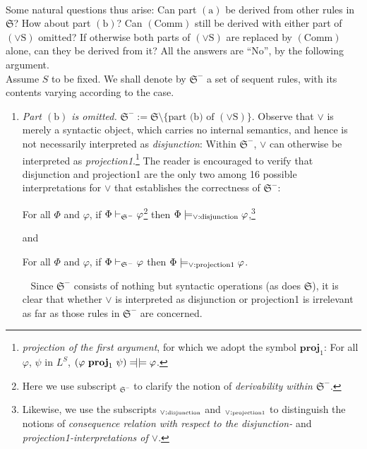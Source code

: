 \begin{enumerate}[1.]
\\
Some natural questions thus arise: Can part $(\mathrm{a})$ be derived from other rules in $\mathfrak{S}$? How about part $(\mathrm{b})$? Can $(\mathrm{Comm})$ still be derived with either part of $(\lor\mathrm{S})$ omitted? If otherwise both parts of $(\lor\mathrm{S})$ are replaced by $(\mathrm{Comm})$ alone, can they be derived from it? All the answers are ``No'', by the following argument.\newline
\\
Assume $S$ to be fixed. We shall denote by $\mathfrak{S}^-$ a set of sequent rules, with its contents varying according to the case.
\begin{enumerate}[(1)]
\item \emph{Part $(\mathrm{b})$ is omitted.} \begin{math}\mathfrak{S}^- := \mathfrak{S} \setminus \{\mbox{part (b) of $(\lor\mathrm{S})$}\}\end{math}. Observe that $\lor$ is merely a syntactic object, which carries no internal semantics, and hence is not necessarily interpreted as \emph{disjunction}: Within $\mathfrak{S}^-$, $\lor$ can otherwise be interpreted as \emph{projection1}.\footnote{\emph{projection of the first argument}, for which we adopt the symbol $\mathbf{proj}_1$: For all $\varphi$, $\psi$ in $L^S$, $(\varphi \ \mathbf{proj}_1 \ \psi) \bimodels \varphi$.} The reader is encouraged to verify that disjunction and projection1 are the only two among 16 possible interpretations for $\lor$ that establishes the correctness of $\mathfrak{S}^-$:
\begin{center}
For all $\Phi$ and $\varphi$, if $\Phi \vdash_{\mathfrak{S}^-} \varphi$\footnote{Here we use subscript $_{\mathfrak{S}^-}$ to clarify the notion of \emph{derivability within $\mathfrak{S}^-$}.} then $\Phi \models_{\lor : \mbox{\scriptsize disjunction}} \varphi$,\footnote{Likewise, we use the subscripts $_{\lor : \mbox{\tiny disjunction}}$ and $_{\lor : \mbox{\tiny projection1}}$ to distinguish the notions of \emph{consequence relation with respect to the disjunction-} and \emph{projection1-interpretations of $\lor$}.}
\end{center}
and
\begin{center}
For all $\Phi$ and $\varphi$, if $\Phi \vdash_{\mathfrak{S}^-} \varphi$ then $\Phi \models_{\lor : \mbox{\scriptsize projection1}} \varphi$.
\end{center}
\ \newline
Since $\mathfrak{S}^-$ consists of nothing but syntactic operations (as does $\mathfrak{S}$), it is clear that whether $\lor$ is interpreted as disjunction or projection1 is irrelevant as far as those rules in $\mathfrak{S}^-$ are concerned.\newline

\end{enumerate}
\end{enumerate}

